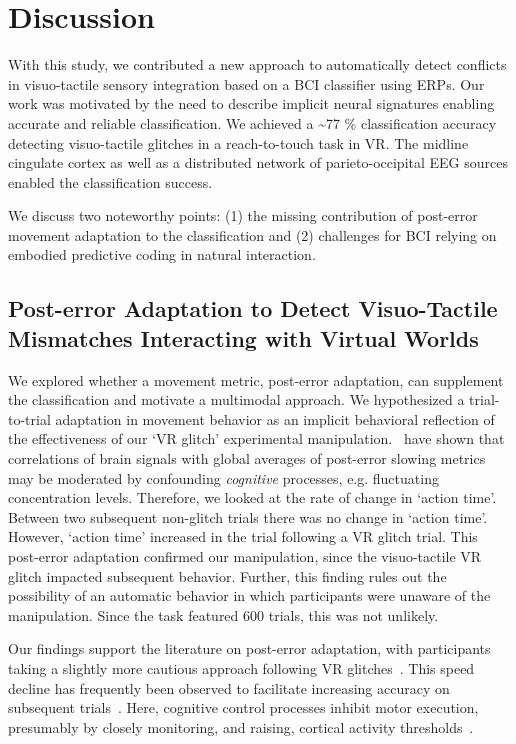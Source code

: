 \section{Discussion}

With this study, we contributed a new approach to automatically detect conflicts in visuo-tactile sensory integration based on a BCI classifier using ERPs. Our work was motivated by the need to describe implicit neural signatures enabling accurate and reliable classification. We achieved a \textasciitilde77 \% classification accuracy detecting visuo-tactile glitches in a reach-to-touch task in VR. The midline cingulate cortex as well as a distributed network of parieto-occipital EEG sources enabled the classification success.

We discuss two noteworthy points: (1) the missing contribution of post-error movement adaptation to the classification and (2) challenges for BCI relying on embodied predictive coding in natural interaction.

\subsection{Post-error Adaptation to Detect Visuo-Tactile Mismatches Interacting with Virtual Worlds}

We explored whether a movement metric, post-error adaptation, can supplement the classification and motivate a multimodal approach. We hypothesized a trial-to-trial adaptation in movement behavior as an implicit behavioral reflection of the effectiveness of our `VR glitch' experimental manipulation.~\citet{Dutilh2012-ps} have shown that correlations of brain signals with global averages of post-error slowing metrics may be moderated by confounding \textit{cognitive} processes, e.g. fluctuating concentration levels. Therefore, we looked at the rate of change in `action time'. Between two subsequent non-glitch trials there was no change in `action time'. However, `action time' increased in the trial following a VR glitch trial. This post-error adaptation confirmed our manipulation, since the visuo-tactile VR glitch impacted subsequent behavior. Further, this finding rules out the possibility of an automatic behavior in which participants were unaware of the manipulation. Since the task featured 600 trials, this was not unlikely. 

Our findings support the literature on post-error adaptation, with participants taking a slightly more cautious approach following VR glitches~\cites{Rabbitt1977-yg}. This speed decline has frequently been observed to facilitate increasing accuracy on subsequent trials~\cite{Ridderinkhof2004-rz}. Here, cognitive control processes inhibit motor execution, presumably by closely monitoring, and raising, cortical activity thresholds~\cite{Botvinick2001-bs}.


